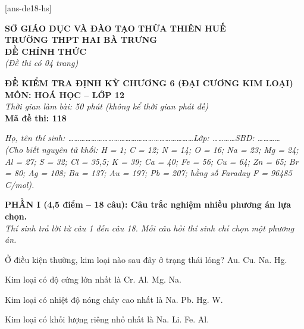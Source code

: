 \documentclass[11pt,a4paper]{article}
\def\loigiai#1{}
\begin{document}
[ans-de18-hs]

\noindent
\begin{minipage}[t]{0.48\textwidth}
	\textbf{SỞ GIÁO DỤC VÀ ĐÀO TẠO THỪA THIÊN HUẾ}\\
	\textbf{TRƯỜNG THPT HAI BÀ TRƯNG}\\
	\textbf{ĐỀ CHÍNH THỨC}\\
	\textit{(Đề thi có 04 trang)}
\end{minipage}\hfill
\begin{minipage}[t]{0.48\textwidth}
	\raggedleft
	\textbf{\color{mainGreen}ĐỀ KIỂM TRA ĐỊNH KỲ CHƯƠNG 6 (ĐẠI CƯƠNG KIM LOẠI)}\\
	\textbf{MÔN: HOÁ HỌC -- LỚP 12}\\
	\textit{Thời gian làm bài: 50 phút (không kể thời gian phát đề)}\\
	\textbf{Mã đề thi: 118}
\end{minipage}


\vspace{1pt}
\noindent\textit{Họ, tên thí sinh: \dots\dots\dots\dots\dots\dots\dots\dots\dots\dots\dots\dots\dots\dots\dots\dots\dots\dots\dots\dots\dots\dots Lớp: \dots\dots\dots\dots SBD: \dots\dots\dots\dots}\\
\noindent\textit{(Cho biết nguyên tử khối: H = 1; C = 12; N = 14; O = 16; Na = 23; Mg = 24; Al = 27; S = 32; Cl = 35,5; K = 39; Ca = 40; Fe = 56; Cu = 64; Zn = 65; Br = 80; Ag = 108; Ba = 137; Au = 197; Pb = 207; hằng số Faraday F = 96485 C/mol).}

\vspace{1pt}
\noindent
\textbf{PHẦN I (4,5 điểm -- 18 câu): Câu trắc nghiệm nhiều phương án lựa chọn.}\\
\textit{Thí sinh trả lời từ câu 1 đến câu 18. Mỗi câu hỏi thí sinh chỉ chọn một phương án.}

\begin{ex}
Ở điều kiện thường, kim loại nào sau đây ở trạng thái lỏng?
\choice
{Au.}
{Cu.}
{Na.}
{Hg.}
\loigiai{}
\end{ex}

\begin{ex}
Kim loại có độ cứng lớn nhất là
\choice
{Cr.}
{Al.}
{Mg.}
{Na.}
\loigiai{}
\end{ex}

\begin{ex}
Kim loại có nhiệt độ nóng chảy cao nhất là
\choice
{Na.}
{Pb.}
{Hg.}
{W.}
\loigiai{}
\end{ex}

\begin{ex}
Kim loại có khối lượng riêng nhỏ nhất là
\choice
{Na.}
{Li.}
{Fe.}
{Al.}
\loigiai{}
\end{ex}
\end{document}
